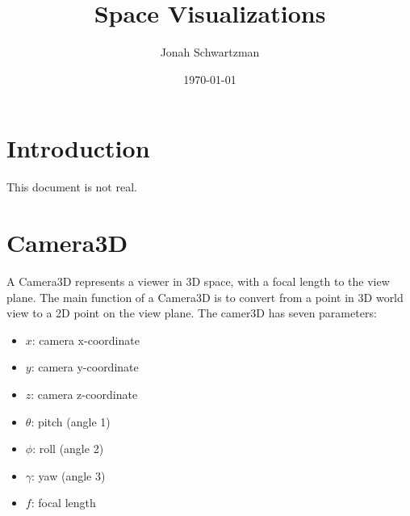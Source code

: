 \documentclass{article}
\begin{document}
\title{Space Visualizations}
\author{Jonah Schwartzman}
\date{\today}

\maketitle

\section{Introduction}
This document is not real.

\section{Camera3D}
A Camera3D represents a viewer in 3D space, with a focal length to the view plane.
The main function of a Camera3D is to convert from a point in 3D world view to a 2D point on the view plane.
The camer3D has seven parameters:
\begin{itemize}
    \item $x$: camera x-coordinate
    \item $y$: camera y-coordinate
    \item $z$: camera z-coordinate
    \item $\theta$: pitch (angle 1)
    \item $\phi$: roll (angle 2)
    \item $\gamma$: yaw (angle 3)
    \item $f$: focal length
\end{itemize}
\end{document}
